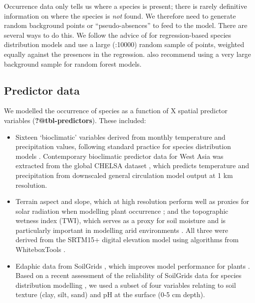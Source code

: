 \documentclass[
  authoryear,
  preprint]{elsarticle}
\providecommand{\tightlist}{%
  \setlength{\itemsep}{0pt}\setlength{\parskip}{0pt}}\usepackage{longtable,booktabs,array}
\begin{document}
Occurrence data only tells us where a species is present; there is
rarely definitive information on where the species is \emph{not} found.
We therefore need to generate random background points or
``pseudo-absences'' to feed to the model. There are several ways to do
this. We follow the advice of \citet{BarbetMassinEtAl2012} for
regression-based species distribution models and use a large (:10000)
random sample of points, weighted equally against the presences in the
regression. \citet{ValaviEtAl2022} also recommend using a very large
background sample for random forest models.

\subsection{Predictor data}\label{predictor-data}

We modelled the occurrence of species as a function of X spatial
predictor variables (\textbf{?@tbl-predictors}). These included:

\begin{itemize}
\tightlist
\item
  Sixteen `bioclimatic' variables derived from monthly temperature and
  precipitation values, following standard practice for species
  distribution models \citep{HijmansEtAl2005}. Contemporary bioclimatic
  predictor data for West Asia was extracted from the global CHELSA
  dataset \citep{KargerEtAl2017}, which predicts temperature and
  precipitation from downscaled general circulation model output at 1 km
  resolution.
\end{itemize}

\begin{itemize}
\tightlist
\item
  Terrain aspect and slope, which at high resolution perform well as
  proxies for solar radiation when modelling plant occurrence
  \citep{AustinVanNiel2011, LeempoelEtAl2015}; and the topographic
  wetness index (TWI), which serves as a proxy for soil moisture and is
  particularly important in modelling arid environments
  \citep{KopeckyCizkova2010, CamposEtAl2016, DiVirgilioEtAl2018}. All
  three were derived from the SRTM15+ digital elevation model using
  algorithms from WhiteboxTools \citep{Lindsay2016}.
\end{itemize}

\begin{itemize}
\tightlist
\item
  Edaphic data from SoilGrids \citep{HenglEtAl2014, HenglEtAl2017},
  which improves model performance for plants
  \citep{DubuisEtAl2013, ModEtAl2016, VelazcoEtAl2017}. Based on a
  recent assessment of the reliability of SoilGrids data for species
  distribution modelling \citep{MillerEtAl2024}, we used a subset of
  four variables relating to soil texture (clay, silt, sand) and pH at
  the surface (0-5 cm depth).
\end{itemize}
\end{document}
